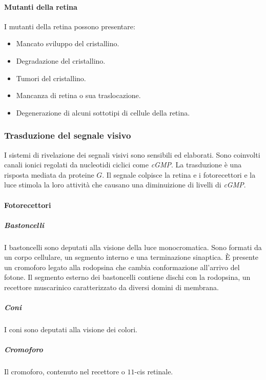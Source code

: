 			\paragraph{Mutanti della retina}
			I mutanti della retina possono presentare:
			\begin{multicols}{2}
				\begin{itemize}
					\item Mancato sviluppo del cristallino.
					\item Degradazione del cristallino.
					\item Tumori del cristallino.
					\item Mancanza di retina o sua traslocazione.
					\item Degenerazione di alcuni sottotipi di cellule della retina.
				\end{itemize}
			\end{multicols}

		\subsubsection{Trasduzione del segnale visivo}
		I sistemi di rivelazione dei segnali visivi sono sensibili ed elaborati.
		Sono coinvolti canali ionici regolati da nucleotidi ciclici come \emph{cGMP}.
		La trasduzione \`e una risposta mediata da proteine $G$.
		Il segnale colpisce la retina e i fotorecettori e la luce stimola la loro attivit\`a che causano una diminuizione di livelli di \emph{cGMP}.

			\paragraph{Fotorecettori}

				\subparagraph{Bastoncelli}
				I bastoncelli sono deputati alla visione della luce monocromatica.
				Sono formati da un corpo cellulare, un segmento interno e una terminazione sinaptica.
				\`E presente un cromoforo legato alla rodopsina che cambia conformazione all'arrivo del fotone.
				Il segmento esterno dei bastoncelli contiene dischi con la rodopsina, un recettore muscarinico caratterizzato da diversi domini di membrana.

				\subparagraph{Coni}
				I coni sono deputati alla visione dei colori.

				\subparagraph{Cromoforo}
				Il cromoforo, contenuto nel recettore o $11$-cis retinale.

